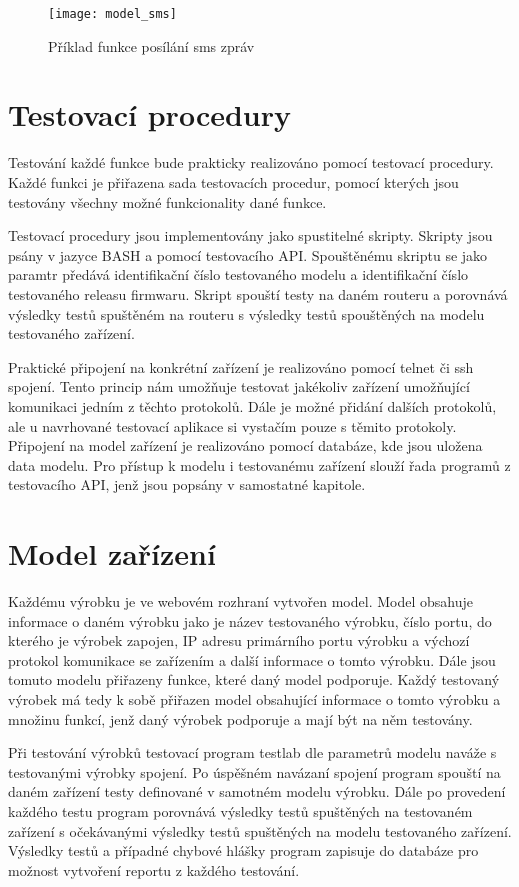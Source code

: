 \begin{figure}[h]
  \centering
  \texttt{[image: model\_sms]}
  \caption{Příklad funkce posílání sms zpráv}
  \label{fig:model_sms}
\end{figure}

\section{Testovací procedury}
Testování každé funkce bude prakticky realizováno pomocí testovací procedury. Každé funkci je přiřazena sada testovacích procedur, pomocí kterých jsou testovány všechny možné funkcionality dané funkce.

Testovací procedury jsou implementovány jako spustitelné skripty. Skripty jsou psány v jazyce BASH a pomocí testovacího API. Spouštěnému skriptu se jako paramtr předává identifikační číslo testovaného modelu a identifikační číslo testovaného releasu firmwaru. Skript spouští testy na daném routeru a porovnává výsledky testů spuštěném na routeru s výsledky testů spouštěných na modelu testovaného zařízení.

Praktické připojení na konkrétní zařízení je realizováno pomocí telnet či ssh spojení. Tento princip nám umožňuje testovat jakékoliv zařízení umožňující komunikaci jedním z těchto protokolů. Dále je možné přidání dalších protokolů, ale u navrhované testovací aplikace si vystačím pouze s těmito protokoly. Připojení na model zařízení je realizováno pomocí databáze, kde jsou uložena data modelu. Pro přístup k modelu i testovanému zařízení slouží řada programů z testovacího API, jenž jsou popsány v samostatné kapitole.

\section{Model zařízení}
Každému výrobku je ve webovém rozhraní vytvořen model. Model obsahuje informace o daném výrobku jako je název testovaného výrobku, číslo portu, do kterého je výrobek zapojen, IP adresu primárního portu výrobku a výchozí protokol komunikace se zařízením a další informace o tomto výrobku. Dále jsou tomuto modelu přiřazeny funkce, které daný model podporuje. Každý testovaný výrobek má tedy k sobě přiřazen model obsahující informace o tomto výrobku a množinu funkcí, jenž daný výrobek podporuje a mají být na něm testovány.

Při testování výrobků testovací program testlab dle parametrů modelu naváže s testovanými výrobky spojení. Po úspěšném navázaní spojení program spouští na daném zařízení testy definované v samotném modelu výrobku. Dále po provedení každého testu program porovnává výsledky testů spuštěných na testovaném zařízení s očekávanými výsledky testů spuštěných na modelu testovaného zařízení. Výsledky testů a případné chybové hlášky program zapisuje do databáze pro možnost vytvoření reportu z každého testování.

